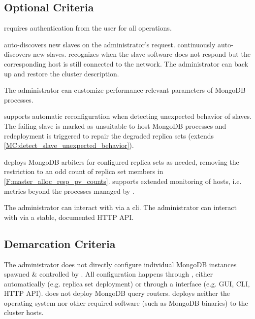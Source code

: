 \subsection{Optional Criteria}\label{OptionalCriteria}
\begin{description}
	
	 \mamid requires authentication from the user for all operations. 
	
	 \mamid auto-discovers new slaves on the administrator's request. \notdone
	 \mamid continuously auto-discovers new slaves. \notdone
	 \mamid recognizes when the slave software does not respond but the corresponding host is still 
	connected to the network.  \notdone
	 The administrator can back up and restore the cluster description. 
	
	 The administrator can customize performance-relevant parameters of MongoDB 
	processes. \notdone
	
	 \mamid supports automatic reconfiguration when detecting unexpected behavior of slaves. The failing 
	slave is marked as unsuitable to host MongoDB processes and redeployment is triggered to repair the degraded \glspl{replica 
	set} (extends \ref{MC:detect_slave_unexpected_behavior}). \notdone
	
	 \mamid deploys MongoDB arbiters for configured \glspl{replica set} as needed, removing the 
	restriction to an odd count of \gls{replica set} members in \ref{F:master_alloc_resp_pv_counts}.  \notdone
	 \mamid supports extended monitoring of hosts, i.e. metrics beyond the processes managed by \mamid.  
	\notdone
	
	 The administrator can interact with \mamid via a cli.  \notdone
	 The administrator can interact with \mamid via a stable, documented HTTP API.  \done
\end{description}

\subsection{Demarcation Criteria}
\begin{description}
	 The administrator does not directly configure individual MongoDB instances spawned \& controlled by \mamid. 
	All configuration happens through \mamid, either automatically (e.g. \gls{replica set} deployment) or through a \mamid interface (e.g. 
	GUI, CLI, HTTP API). 
	 \mamid does not deploy MongoDB query routers.  \done
	 \mamid deploys neither the operating system nor other required software (such as MongoDB binaries) to the 
	cluster hosts.  \done
\end{description}